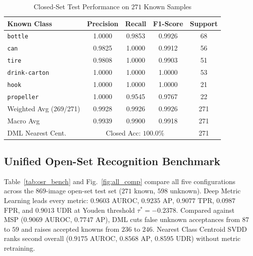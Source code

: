 \documentclass[conference]{IEEEtran}
\begin{document}
\begin{table}[!htbp]
\centering
\caption{Closed-Set Test Performance on $271$ Known Samples}
\label{tab:closed}
\footnotesize
\setlength{\tabcolsep}{3.5pt}
\begin{tabular}{@{}lcccc@{}}
\toprule
Known Class & Precision & Recall & F1-Score & Support \\
\midrule
\texttt{bottle}       & 1.0000 & 0.9853 & 0.9926 & 68 \\
\texttt{can}          & 0.9825 & 1.0000 & 0.9912 & 56 \\
\texttt{tire}         & 0.9808 & 1.0000 & 0.9903 & 51 \\
\texttt{drink-carton} & 1.0000 & 1.0000 & 1.0000 & 53 \\
\texttt{hook}         & 1.0000 & 1.0000 & 1.0000 & 21 \\
\texttt{propeller}    & 1.0000 & 0.9545 & 0.9767 & 22 \\
\midrule
Weighted Avg (269/271) & 0.9928 & 0.9926 & 0.9926 & 271 \\
Macro Avg              & 0.9939 & 0.9900 & 0.9918 & 271 \\
DML Nearest Cent.      & \multicolumn{3}{c}{Closed Acc: $100.0\%$} & 271 \\
\bottomrule
\end{tabular}
\end{table}

\subsection{Unified Open-Set Recognition Benchmark}
\label{sec:unified}

Table~\ref{tab:osr_bench} and Fig.~\ref{fig:all_comp} compare all five configurations across the $869$-image open-set test set ($271$ known, $598$ unknown). Deep Metric Learning leads every metric: $0.9603$ $\mathrm{AUROC}$, $0.9235$ $\mathrm{AP}$, $0.9077$ $\mathrm{TPR}$, $0.0987$ $\mathrm{FPR}$, and $0.9013$ $\mathrm{UDR}$ at Youden threshold $\tau^* = -0.2378$. Compared against MSP ($0.9069$ $\mathrm{AUROC}$, $0.7747$ $\mathrm{AP}$), DML cuts false unknown acceptances from $87$ to $59$ and raises accepted knowns from $236$ to $246$. Nearest Class Centroid SVDD ranks second overall ($0.9175$ $\mathrm{AUROC}$, $0.8568$ $\mathrm{AP}$, $0.8595$ $\mathrm{UDR}$) without metric retraining.
\end{document}
